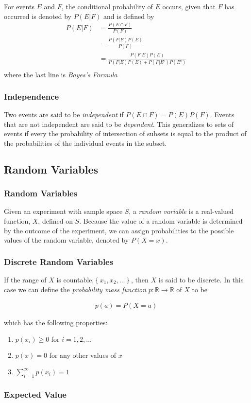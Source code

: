 \documentclass[10pt]{article}
\begin{document}
		For events $E$ and $F$, the conditional probability of $E$ occurs, given that $F$ has occurred is denoted by  $P(E|F)$ and is defined by
		\begin{align*}
			P(E|F) 
				&= \frac{P(E\cap F)}{P(F)}\\
				&= \frac{P(F|E)P(E)}{P(F)}\\
				&= \frac{P(F|E)P(E)}{P(F|E)P(E)+P(F|E^c)P(E^c)}\\
		\end{align*}
		where the last line is \emph{Bayes's Formula}
		
		\subsubsection*{Independence}
		
		Two events are said to be \emph{independent} if $P(E\cap F) = P(E)P(F)$. Events that are not independent are said to be \emph{dependent}.  This generalizes to sets of events if every the probability of intersection of subsets is equal to the product of the probabilities of the individual events in the subset.
		
		\subsection{Random Variables}
		
		\subsubsection*{Random Variables}
		
		Given an experiment with sample space $S$, a \emph{random variable} is a real-valued function, $X$, defined on $S$. Because the value of a random variable is determined by the outcome of the experiment, we can assign probabilities to the possible values of the random variable, denoted by $P(X=x)$.
		
		\subsubsection*{Discrete Random Variables}
		If the range of $X$ is countable,$\left\{ x_1, x_2, \ldots \right\}$, then $X$ is said to be discrete. In this case we can define the \emph{probability mass function} $p:\mathbb{R}\to\mathbb{R}$ of $X$ to be
		
		\begin{align*}
			p(a) = P(X=a)
		\end{align*}
		
		\noindent which has the following properties:
		
		\begin{enumerate}
			\item $p(x_i) \geq 0$ for $i=1,2,\ldots$
			\item $p(x) = 0$ for any other values of $x$
			\item $\sum_{i=1}^{\infty}p(x_i) = 1$
		\end{enumerate}
		
		\subsubsection*{Expected Value}
\end{document}
